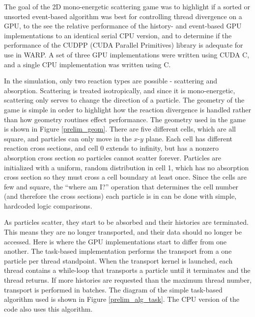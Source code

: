 The goal of the 2D mono-energetic scattering game was to highlight if a sorted or unsorted event-based algorithm was best for controlling thread divergence on a GPU, to the see the relative performance of the history- and event-based GPU implementations to an identical serial CPU version, and to determine if the performance of the CUDPP (CUDA Parallel Primitives) library is adequate for use in WARP.   A set of three GPU implementations were written using CUDA C, and a single CPU implementation was written using C.  

In the simulation, only two reaction types are possible - scattering and absorption.  Scattering is treated isotropically, and since it is mono-energetic, scattering only serves to change the direction of a particle.  The geometry of the game is simple in order to highlight how the reaction divergence is handled rather than how geometry routines effect performance.   The geometry used in the game is shown in Figure \ref{prelim_geom}.  There are five different cells, which are all square, and particles can only move in the $x$-$y$ plane.  Each cell has different reaction cross sections, and cell 0 extends to infinity, but has a nonzero absorption cross section so particles cannot scatter forever.  Particles are initialized with a uniform, random distribution in cell 1, which has no absorption cross section so they must cross a cell boundary at least once.  Since the cells are few and square, the ``where am I?'' operation that determines the cell number (and therefore the cross sections) each particle is in can be done with simple, hardcoded logic comparisons.

As particles scatter, they start to be absorbed and their histories are terminated.  This means they are no longer transported, and their data should no longer be accessed.  Here is where the GPU implementations start to differ from one another.  The task-based implementation performs the transport from a one particle per thread standpoint.  When the transport kernel is launched, each thread contains a while-loop that transports a particle until it terminates and the thread returns.  If more histories are requested than the maximum thread number, transport is performed in batches.  The diagram of the simple task-based algorithm used is shown in Figure \ref{prelim_alg_task}.  The CPU version of the code also uses this algorithm.

